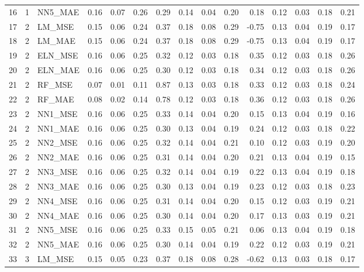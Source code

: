 \begin{table}[ht]
\begin{tabular}{rrlrrrrrrrrrrrr}
  16 &   1 & NN5\_MAE & 0.16 & 0.07 & 0.26 & 0.29 & 0.14 & 0.04 & 0.20 & 0.18 & 0.12 & 0.03 & 0.18 & 0.21 \\ 
  17 &   2 & LM\_MSE & 0.15 & 0.06 & 0.24 & 0.37 & 0.18 & 0.08 & 0.29 & -0.75 & 0.13 & 0.04 & 0.19 & 0.17 \\ 
  18 &   2 & LM\_MAE & 0.15 & 0.06 & 0.24 & 0.37 & 0.18 & 0.08 & 0.29 & -0.75 & 0.13 & 0.04 & 0.19 & 0.17 \\ 
  19 &   2 & ELN\_MSE & 0.16 & 0.06 & 0.25 & 0.32 & 0.12 & 0.03 & 0.18 & 0.35 & 0.12 & 0.03 & 0.18 & 0.26 \\ 
  20 &   2 & ELN\_MAE & 0.16 & 0.06 & 0.25 & 0.30 & 0.12 & 0.03 & 0.18 & 0.34 & 0.12 & 0.03 & 0.18 & 0.26 \\ 
  21 &   2 & RF\_MSE & 0.07 & 0.01 & 0.11 & 0.87 & 0.13 & 0.03 & 0.18 & 0.33 & 0.12 & 0.03 & 0.18 & 0.24 \\ 
  22 &   2 & RF\_MAE & 0.08 & 0.02 & 0.14 & 0.78 & 0.12 & 0.03 & 0.18 & 0.36 & 0.12 & 0.03 & 0.18 & 0.26 \\ 
  23 &   2 & NN1\_MSE & 0.16 & 0.06 & 0.25 & 0.33 & 0.14 & 0.04 & 0.20 & 0.15 & 0.13 & 0.04 & 0.19 & 0.16 \\ 
  24 &   2 & NN1\_MAE & 0.16 & 0.06 & 0.25 & 0.30 & 0.13 & 0.04 & 0.19 & 0.24 & 0.12 & 0.03 & 0.18 & 0.22 \\ 
  25 &   2 & NN2\_MSE & 0.16 & 0.06 & 0.25 & 0.32 & 0.14 & 0.04 & 0.21 & 0.10 & 0.12 & 0.03 & 0.19 & 0.20 \\ 
  26 &   2 & NN2\_MAE & 0.16 & 0.06 & 0.25 & 0.31 & 0.14 & 0.04 & 0.20 & 0.21 & 0.13 & 0.04 & 0.19 & 0.15 \\ 
  27 &   2 & NN3\_MSE & 0.16 & 0.06 & 0.25 & 0.32 & 0.14 & 0.04 & 0.19 & 0.22 & 0.13 & 0.04 & 0.19 & 0.18 \\ 
  28 &   2 & NN3\_MAE & 0.16 & 0.06 & 0.25 & 0.30 & 0.13 & 0.04 & 0.19 & 0.23 & 0.12 & 0.03 & 0.18 & 0.23 \\ 
  29 &   2 & NN4\_MSE & 0.16 & 0.06 & 0.25 & 0.31 & 0.14 & 0.04 & 0.20 & 0.15 & 0.12 & 0.03 & 0.19 & 0.21 \\ 
  30 &   2 & NN4\_MAE & 0.16 & 0.06 & 0.25 & 0.30 & 0.14 & 0.04 & 0.20 & 0.17 & 0.13 & 0.03 & 0.19 & 0.21 \\ 
  31 &   2 & NN5\_MSE & 0.16 & 0.06 & 0.25 & 0.33 & 0.15 & 0.05 & 0.21 & 0.06 & 0.13 & 0.04 & 0.19 & 0.18 \\ 
  32 &   2 & NN5\_MAE & 0.16 & 0.06 & 0.25 & 0.30 & 0.14 & 0.04 & 0.19 & 0.22 & 0.12 & 0.03 & 0.19 & 0.21 \\ 
  33 &   3 & LM\_MSE & 0.15 & 0.05 & 0.23 & 0.37 & 0.18 & 0.08 & 0.28 & -0.62 & 0.13 & 0.03 & 0.18 & 0.17 \\ 

\end{tabular}
\end{table}
